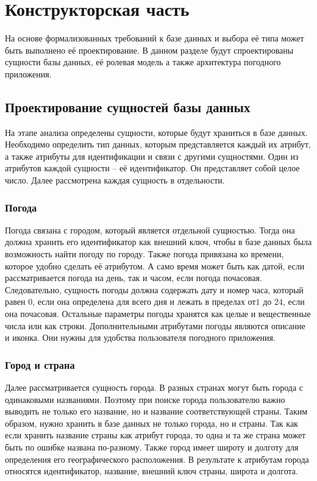 \chapter{Конструкторская часть}

На основе формализованных требований к базе данных и выбора её типа может быть выполнено её проектирование.
В данном разделе будут спроектированы сущности базы данных, её ролевая модель а также архитектура погодного приложения.

\section{Проектирование сущностей базы данных}

На этапе анализа определены сущности, которые будут храниться в базе данных.
Необходимо определить тип данных, которым представляется каждый их атрибут, а также атрибуты для идентификации и связи с другими сущностями.
Один из атрибутов каждой сущности -- её идентификатор.
Он представляет собой целое число.
Далее рассмотрена каждая сущность в отдельности.

\subsection*{Погода}
Погода связана с городом, который является отдельной сущностью.
Тогда она должна хранить его идентификатор как внешний ключ, чтобы в базе данных была возможность найти погоду по городу.
Также погода привязана ко времени, которое удобно сделать её атрибутом.
А само время может быть как датой, если рассматривается погода на день, так и часом, если погода почасовая.
Следовательно, сущность погоды должна содержать дату и номер часа, который равен $0$, если она определена для всего дня и лежать в пределах от$1$ до $24$, если она почасовая.
Остальные параметры погоды хранятся как целые и вещественные числа или как строки.
Дополнительными атрибутами погоды являются описание и иконка.
Они нужны для удобства пользователя погодного приложения.

\subsection*{Город и страна}
Далее рассматривается сущность города.
В разных странах могут быть города с одинаковыми названиями.
Поэтому при поиске города пользователю важно выводить не только его название, но и название соответствующей страны.
Таким образом, нужно хранить в базе данных не только города, но и страны.
Так как если хранить название страны как атрибут города, то одна и та же страна может быть по ошибке названа по-разному.
Также город имеет широту и долготу для определения его географического расположения.
В результате к атрибутам города относятся идентификатор, название, внешний ключ страны, широта и долгота.

